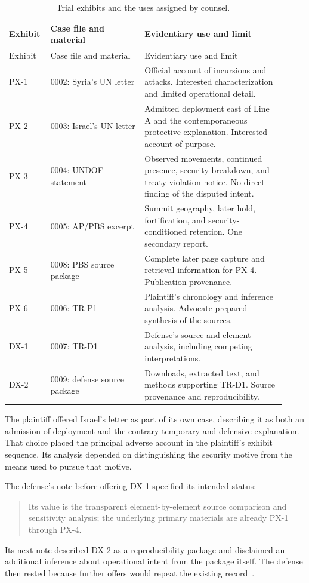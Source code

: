 \begin{longtable}{@{}L{0.12\linewidth}L{0.32\linewidth}L{0.48\linewidth}@{}}
\caption{Trial exhibits and the uses assigned by counsel.}\label{tab:exhibits}\\
\toprule Exhibit & Case file and material & Evidentiary use and limit\\ \midrule
\endfirsthead
\toprule Exhibit & Case file and material & Evidentiary use and limit\\ \midrule
\endhead
PX-1 & 0002: Syria's UN letter & Official account of incursions and attacks.  Interested characterization and limited operational detail.\\
PX-2 & 0003: Israel's UN letter & Admitted deployment east of Line A and the contemporaneous protective explanation.  Interested account of purpose.\\
PX-3 & 0004: UNDOF statement & Observed movements, continued presence, security breakdown, and treaty-violation notice.  No direct finding of the disputed intent.\\
PX-4 & 0005: AP/PBS excerpt & Summit geography, later hold, fortification, and security-conditioned retention.  One secondary report.\\
PX-5 & 0008: PBS source package & Complete later page capture and retrieval information for PX-4.  Publication provenance.\\
PX-6 & 0006: TR-P1 & Plaintiff's chronology and inference analysis.  Advocate-prepared synthesis of the sources.\\
DX-1 & 0007: TR-D1 & Defense's source and element analysis, including competing interpretations.\\
DX-2 & 0009: defense source package & Downloads, extracted text, and methods supporting TR-D1.  Source provenance and reproducibility.\\
\bottomrule
\end{longtable}

The plaintiff offered Israel's letter as part of its own case, describing it as both an admission of deployment and the contrary temporary-and-defensive explanation.  That choice placed the principal adverse account in the plaintiff's exhibit sequence.  Its analysis depended on distinguishing the security motive from the means used to pursue that motive.

The defense's note before offering DX-1 specified its intended status:
\begin{quote}
Its value is the transparent element-by-element source comparison and sensitivity analysis; the underlying primary materials are already PX-1 through PX-4.
\end{quote}
Its next note described DX-2 as a reproducibility package and disclaimed an additional inference about operational intent from the package itself.  The defense then rested because further offers would repeat the existing record~\cite[notes at 16:22:34--16:23:15]{record}.

